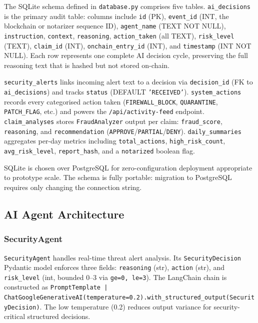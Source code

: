 \documentclass[12pt,a4paper]{article}
\begin{document}
The SQLite schema defined in \texttt{database.py} comprises five tables.
\texttt{ai\_decisions} is the primary audit table: columns include \texttt{id}
(PK), \texttt{event\_id} (INT, the blockchain or notarizer sequence ID),
\texttt{agent\_name} (TEXT NOT NULL), \texttt{instruction}, \texttt{context},
\texttt{reasoning}, \texttt{action\_taken} (all TEXT), \texttt{risk\_level}
(TEXT), \texttt{claim\_id} (INT), \texttt{onchain\_entry\_id} (INT), and
\texttt{timestamp} (INT NOT NULL). Each row represents one complete AI
decision cycle, preserving the full reasoning text that is hashed but not
stored on-chain.

\texttt{security\_alerts} links incoming alert text to a decision via
\texttt{decision\_id} (FK to \texttt{ai\_decisions}) and tracks
\texttt{status} (DEFAULT \texttt{'RECEIVED'}).
\texttt{system\_actions} records every categorised action taken
(\texttt{FIREWALL\_BLOCK}, \texttt{QUARANTINE}, \texttt{PATCH\_FLAG}, etc.)
and powers the \texttt{/api/activity-feed} endpoint.
\texttt{claim\_analyses} stores \texttt{FraudAnalyzer} output per claim:
\texttt{fraud\_score}, \texttt{reasoning}, and \texttt{recommendation}
(\texttt{APPROVE}/\texttt{PARTIAL}/\texttt{DENY}).
\texttt{daily\_summaries} aggregates per-day metrics including
\texttt{total\_actions}, \texttt{high\_risk\_count},
\texttt{avg\_risk\_level}, \texttt{report\_hash}, and a
\texttt{notarized} boolean flag.

SQLite is chosen over PostgreSQL for zero-configuration deployment
appropriate to prototype scale. The schema is fully portable: migration
to PostgreSQL requires only changing the connection string.

\subsection{AI Agent Architecture}
\label{sec:agents}

\subsubsection{SecurityAgent}
\label{sec:security-agent}

\texttt{SecurityAgent} handles real-time threat alert analysis.
Its \texttt{SecurityDecision} Pydantic model enforces three fields:
\texttt{reasoning} (str), \texttt{action} (str), and \texttt{risk\_level}
(int, bounded 0--3 via \texttt{ge=0, le=3}). The LangChain chain is
constructed as \texttt{PromptTemplate | ChatGoogleGenerativeAI(temperature=0.2).with\_structured\_output(SecurityDecision)}.
The low temperature (0.2) reduces output variance for security-critical
structured decisions.
\end{document}
